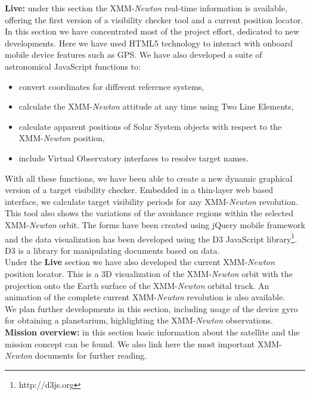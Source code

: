 {\bf Live:} under this section the XMM-{\em Newton} real-time information is available,
offering the first version of a visibility checker tool and a current
position locator.\\ 

In this section we have concentrated most of the project effort,
dedicated to new developments. Here we have used HTML5 technology to
interact with onboard mobile device features such as GPS. We have also
developed a suite of astronomical JavaScript functions to:
\begin{itemize}
\item convert coordinates for different reference systems,
\item calculate the XMM-{\em Newton} attitude at any time using Two Line Elements,
\item calculate apparent positions of Solar System objects with respect to the XMM-{\em Newton} position,
\item include Virtual Observatory interfaces to resolve target names.
\end{itemize}

With all these functions, we have been able to create a new dynamic
graphical version of a target visibility checker. Embedded in a
thin-layer web based interface, we calculate target visibility periods
for any XMM-{\em Newton} revolution. This tool also shows the variations of the
avoidance regions within the selected XMM-{\em Newton} orbit. The forms have been
created using jQuery mobile framework and the data visualization has
been developed using the D3 JavaScript
library\footnote{http://d3js.org}. D3 is a library for manipulating
documents based on data. \\

Under the {\bf Live} section we have also developed the current XMM-{\em Newton}
position locator. This is a 3D visualization of the XMM-{\em Newton} orbit with
the projection onto the Earth surface of the XMM-{\em Newton} orbital track. An
animation of the complete current XMM-{\em Newton} revolution is also available. \\

We plan further developments in this section, including usage of the
device gyro for obtaining a planetarium, highlighting the XMM-{\em Newton} observations.\\

{\bf Mission overview:} in this section basic information about the satellite and
the mission concept can be found. We also link here the
most important XMM-{\em Newton} documents for further reading. \\

